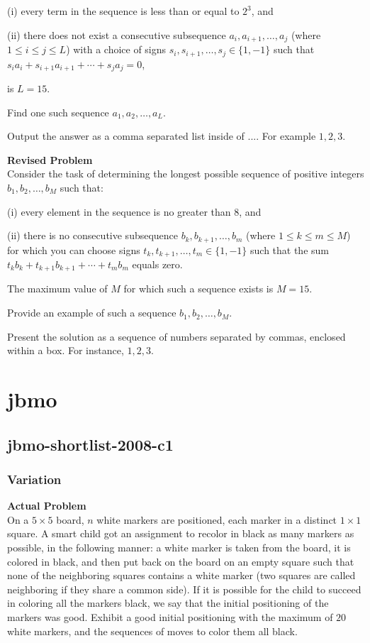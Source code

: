 (i) every term in the sequence is less than or equal to $2^3$, and

(ii) there does not exist a consecutive subsequence $a_i, a_{i+1}, \ldots, a_{j}$ (where $1 \leq i \leq j \leq L$) with
a choice of signs $s_i, s_{i+1}, \ldots, s_{j} \in \{1, -1\}$ such that $s_i a_i + s_{i+1} a_{i+1} + \cdots + s_{j} a_{j} = 0$,

is $L = 15$.

Find one such sequence $a_1, a_2, \ldots, a_L$.

Output the answer as a comma separated list inside of $\boxed{...}$. For example $\boxed{1, 2, 3}$.

\textbf{Revised Problem}\\
Consider the task of determining the longest possible sequence of positive integers \(b_1, b_2, \ldots, b_M\) such that:

(i) every element in the sequence is no greater than \(8\), and

(ii) there is no consecutive subsequence \(b_k, b_{k+1}, \ldots, b_m\) (where \(1 \leq k \leq m \leq M\)) for which you can choose signs \(t_k, t_{k+1}, \ldots, t_m \in \{1, -1\}\) such that the sum \(t_k b_k + t_{k+1} b_{k+1} + \cdots + t_m b_m\) equals zero.

The maximum value of \(M\) for which such a sequence exists is \(M = 15\).

Provide an example of such a sequence \(b_1, b_2, \ldots, b_M\).

Present the solution as a sequence of numbers separated by commas, enclosed within a box. For instance, \(\boxed{1, 2, 3}\).

\section{jbmo}
\subsection{jbmo-shortlist-2008-c1}
\subsubsection{Variation}
\textbf{Actual Problem}\\
On a $5 \times 5$ board, $n$ white markers are positioned, each marker in a distinct $1 \times 1$ square. A smart child got an assignment to recolor in black as many markers as possible, in the following manner: a white marker is taken from the board, it is colored in black, and then put back on the board on an empty square such that none of the neighboring squares contains a white marker (two squares are called neighboring if they share a common side).
If it is possible for the child to succeed in coloring all the markers black, we say that the initial positioning of the markers was good. Exhibit a good initial positioning with the maximum of $20$ white markers, and the sequences of moves to color them all black.

